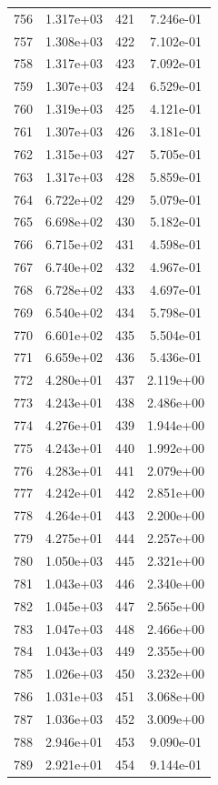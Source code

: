 \documentclass[12pt]{article}
\begin{document}
\begin{longtable}{@{}cccc@{}}
756 & 1.317e+03 & 421 & 7.246e-01 \\
757 & 1.308e+03 & 422 & 7.102e-01 \\
758 & 1.317e+03 & 423 & 7.092e-01 \\
759 & 1.307e+03 & 424 & 6.529e-01 \\
760 & 1.319e+03 & 425 & 4.121e-01 \\
761 & 1.307e+03 & 426 & 3.181e-01 \\
762 & 1.315e+03 & 427 & 5.705e-01 \\
763 & 1.317e+03 & 428 & 5.859e-01 \\
764 & 6.722e+02 & 429 & 5.079e-01 \\
765 & 6.698e+02 & 430 & 5.182e-01 \\
766 & 6.715e+02 & 431 & 4.598e-01 \\
767 & 6.740e+02 & 432 & 4.967e-01 \\
768 & 6.728e+02 & 433 & 4.697e-01 \\
769 & 6.540e+02 & 434 & 5.798e-01 \\
770 & 6.601e+02 & 435 & 5.504e-01 \\
771 & 6.659e+02 & 436 & 5.436e-01 \\
772 & 4.280e+01 & 437 & 2.119e+00 \\
773 & 4.243e+01 & 438 & 2.486e+00 \\
774 & 4.276e+01 & 439 & 1.944e+00 \\
775 & 4.243e+01 & 440 & 1.992e+00 \\
776 & 4.283e+01 & 441 & 2.079e+00 \\
777 & 4.242e+01 & 442 & 2.851e+00 \\
778 & 4.264e+01 & 443 & 2.200e+00 \\
779 & 4.275e+01 & 444 & 2.257e+00 \\
780 & 1.050e+03 & 445 & 2.321e+00 \\
781 & 1.043e+03 & 446 & 2.340e+00 \\
782 & 1.045e+03 & 447 & 2.565e+00 \\
783 & 1.047e+03 & 448 & 2.466e+00 \\
784 & 1.043e+03 & 449 & 2.355e+00 \\
785 & 1.026e+03 & 450 & 3.232e+00 \\
786 & 1.031e+03 & 451 & 3.068e+00 \\
787 & 1.036e+03 & 452 & 3.009e+00 \\
788 & 2.946e+01 & 453 & 9.090e-01 \\
789 & 2.921e+01 & 454 & 9.144e-01 \\

\end{longtable}
\end{document}

